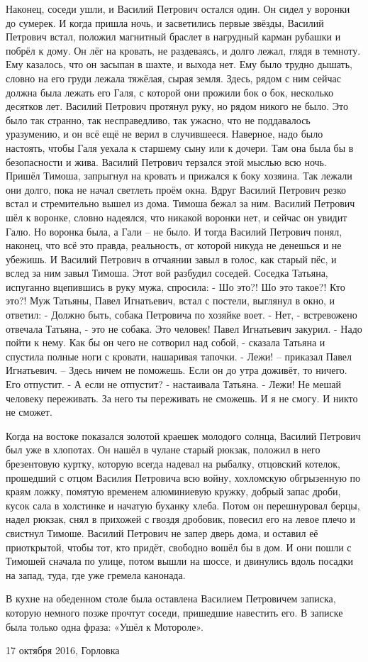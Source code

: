 Наконец, соседи ушли, и Василий Петрович остался один. Он сидел у воронки до сумерек. И когда пришла ночь, и засветились первые звёзды, Василий Петрович встал, положил магнитный браслет в нагрудный карман рубашки и побрёл к дому. Он лёг на кровать, не раздеваясь, и долго лежал, глядя в темноту. Ему казалось, что он засыпан в шахте, и выхода нет. Ему было трудно дышать, словно на его груди лежала тяжёлая, сырая земля.
Здесь, рядом с ним сейчас должна была лежать его Галя, с которой они прожили бок о бок, несколько десятков лет. Василий Петрович протянул руку, но рядом никого не было. Это было так странно, так несправедливо, так ужасно, что не поддавалось уразумению, и он всё ещё не верил в случившееся. Наверное, надо было настоять, чтобы Галя уехала к старшему сыну или к дочери. Там она была бы в безопасности и жива. Василий Петрович терзался этой мыслью всю ночь. Пришёл Тимоша, запрыгнул на кровать и прижался к боку хозяина.
Так лежали они долго, пока не начал светлеть проём окна. Вдруг Василий Петрович резко встал и стремительно вышел из дома. Тимоша бежал за ним. Василий Петрович шёл к воронке, словно надеялся, что никакой воронки нет, и сейчас он увидит Галю. Но воронка была, а Гали – не было. И тогда Василий Петрович понял, наконец, что всё это правда, реальность, от которой никуда не денешься и не убежишь. И Василий Петрович в отчаянии завыл в голос, как старый пёс, и вслед за ним завыл Тимоша. Этот вой разбудил соседей. Соседка Татьяна, испуганно вцепившись в руку мужа, спросила:
- Шо это?! Шо это такое?! Кто это?!
Муж Татьяны, Павел Игнатьевич, встал с постели, выглянул в окно, и ответил:
- Должно быть, собака Петровича по хозяйке воет.
- Нет, - встревожено отвечала Татьяна, - это не собака. Это человек!
Павел Игнатьевич закурил.
- Надо пойти к нему. Как бы он чего не сотворил над собой, - сказала Татьяна и спустила полные ноги с кровати, нашаривая тапочки.
- Лежи! – приказал Павел Игнатьевич. – Здесь ничем не поможешь. Если он до утра доживёт, то ничего. Его отпустит.
- А если не отпустит? - настаивала Татьяна.
- Лежи! Не мешай человеку переживать. За него ты переживать не сможешь. И я не смогу. И никто не сможет.

Когда на востоке показался золотой краешек молодого солнца, Василий Петрович был уже в хлопотах. Он нашёл в чулане старый рюкзак, положил в него брезентовую куртку, которую всегда надевал на рыбалку, отцовский котелок, прошедший с отцом Василия Петровича всю войну, хохломскую обгрызенную по краям ложку, помятую временем алюминиевую кружку, добрый запас дроби, кусок сала в холстинке и начатую буханку хлеба. Потом он перешнуровал берцы, надел рюкзак, снял  в прихожей с гвоздя дробовик, повесил его на левое плечо и свистнул Тимоше.
Василий Петрович не запер дверь дома, и оставил её приоткрытой, чтобы тот, кто придёт, свободно вошёл бы в дом.
И они пошли с Тимошей сначала по улице, потом вышли на шоссе, и двинулись вдоль посадки на запад, туда,  где уже гремела канонада.

В кухне на обеденном столе была оставлена Василием Петровичем записка, которую немного позже прочтут соседи, пришедшие навестить его. В записке была только одна фраза:
«Ушёл к Мотороле».

17 октября 2016,
Горловка
